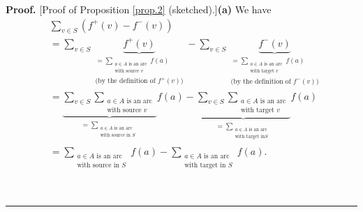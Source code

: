 \documentclass[numbers=enddot,12pt,final,onecolumn,notitlepage]{scrartcl}%
\theoremstyle{definition}
\newenvironment{proof}[1][Proof]{\noindent\textbf{#1.} }{\ \rule{0.5em}{0.5em}}
\let\sumnonlimits\sum
\renewcommand{\sum}{\sumnonlimits\limits}
\begin{document}
\begin{proof}
[Proof of Proposition \ref{prop.2} (sketched).]\textbf{(a)} We have%
\begin{align}
&  \sum_{v\in S}\left(  f^{+}\left(  v\right)  -f^{-}\left(  v\right)  \right)
\nonumber\\
&  =\sum_{v\in S}\underbrace{f^{+}\left(  v\right)  }_{\substack{=\sum
_{\substack{a\in A\text{ is an arc}\\\text{with source }v}}f\left(  a\right)
\\\text{(by the definition of }f^{+}\left(  v\right)  \text{)}}}-\sum_{v\in
S}\underbrace{f^{-}\left(  v\right)  }_{\substack{=\sum_{\substack{a\in
A\text{ is an arc}\\\text{with target }v}}f\left(  a\right)  \\\text{(by the
definition of }f^{-}\left(  v\right)  \text{)}}}\nonumber\\
&  =\underbrace{\sum_{v\in S}\sum_{\substack{a\in A\text{ is an arc}%
\\\text{with source }v}}}_{\substack{=\sum_{\substack{a\in A\text{ is an
arc}\\\text{with source in }S}}}}f\left(  a\right)  -\underbrace{\sum_{v\in
S}\sum_{\substack{a\in A\text{ is an arc}\\\text{with target }v}%
}}_{\substack{=\sum_{\substack{a\in A\text{ is an arc}\\\text{with target in
}S}}}}f\left(  a\right) \nonumber\\
&  =\sum_{\substack{a\in A\text{ is an arc}\\\text{with source in }S}}f\left(
a\right)  -\sum_{\substack{a\in A\text{ is an arc}\\\text{with target in }%
S}}f\left(  a\right)  . \label{pf.prop.2.a.1}%
\end{align}



\end{proof}
\end{document}
